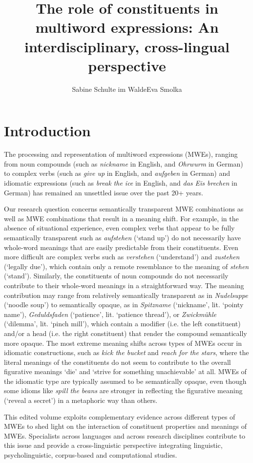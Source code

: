 \documentclass[output=paper]{langsci/langscibook}
\title{The role of constituents in multiword expressions: An interdisciplinary, cross-lingual perspective}
\author{Sabine Schulte im Walde\affiliation{Institut für Maschinelle Sprachverarbeitung, Universität Stuttgart}\lastand  Eva Smolka\affiliation{Fachbereich Sprachwissenschaft, Universität Konstanz}}
\begin{document}
\section{Introduction}

The processing and representation of multiword expressions (MWEs),
ranging from noun compounds (such as \textit{nickname} in English, and
\textit{Ohrwurm} in German) to complex verbs (such as \textit{give up}
in English, and \textit{aufgeben} in German) and idiomatic expressions
(such as \textit{break the ice} in English, and \textit{das Eis
  brechen} in German) has remained an unsettled issue over the past
20+ years.

Our research question concerns semantically transparent MWE
combinations as well as MWE combinations that result in a meaning
shift. For example, in the absence of situational experience, even
complex verbs that appear to be fully semantically transparent such as
\textit{aufstehen} (`stand up') do not necessarily have whole-word
meanings that are easily predictable from their constituents. Even
more difficult are complex verbs such as \textit{verstehen}
(`understand') and \textit{zustehen} (`legally due'), which contain
only a remote resemblance to the meaning of \textit{stehen}
(`stand'). Similarly, the constituents of noun compounds do not
necessarily contribute to their whole-word meanings in a
straightforward way. The meaning contribution may range from
relatively semantically transparent as in \textit{Nudelsuppe}
(`noodle soup') to semantically opaque, as in \textit{Spitzname}
(`nickname', lit. `pointy name'), \textit{Geduldsfaden} (`patience', lit. `patience thread'), or  \textit{Zwickmühle} (`dilemma',
lit. `pinch mill'), which contain a modifier (i.e. the left
constituent) and/or a head (i.e. the right constituent) that render the
compound semantically more opaque.  The most extreme meaning shifts
across types of MWEs occur in idiomatic constructions, such as
\textit{kick the bucket} and \textit{reach for the stars}, where the
literal meanings of the constituents do not seem to contribute to the
overall figurative meanings `die' and `strive for something
unachievable' at all. MWEs of the idiomatic type are typically assumed
to be semantically opaque, even though some idioms like \textit{spill
  the beans} are stronger in reflecting the figurative meaning
(`reveal a secret') in a metaphoric way than others.

This edited volume exploits complementary evidence across different
types of MWEs to shed light on the interaction of constituent
properties and meanings of MWEs. Specialists across languages and
across research disciplines contribute to this issue and provide a
cross-linguistic perspective integrating linguistic, psycholinguistic,
corpus-based and computational studies.
\end{document}
